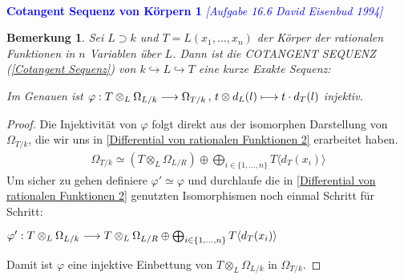 \documentclass[10pt,a4paper]{report}
\newcommand{\comment}[1]{}
\newcommand{\ModulsOfDifferenzials}{David Eisenbud 1994}
\newcounter{Aussage}[chapter]
\newtheorem{bem}[Aussage]{Bemerkung}
\newcommand{\functionfront}[3]{\nolinebreak{#1:#2 \longrightarrow #3}}
\newcommand{\function}[5]{\nolinebreak{#1:#2 \longrightarrow #3 \, , \, #4 \longmapsto #5}}
\newcommand{\divR}[2]{\Omega_{#1/#2}}
\newcommand{\divf}[1]{d_{#1}}
\newcommand{\Tensor}[3]{#1 \otimes_{#2} #3}
\newcommand{\tensor}[3]{#1 \otimes #3}
\newcommand{\Verz}[1]{\langle #1 \rangle}
\begin{document}
\ \\
\textcolor{blue}{\textbf{Cotangent Sequenz von Körpern 1} \textit{[Aufgabe 16.6 \ModulsOfDifferenzials]}}
\begin{bem} \comment{\label{Cotangent Sequenz von Körpern 1}}
Sei $L \supset k$ und $T = L(x_1, \dots ,x_n)$ der Körper der rationalen Funktionen in $n$ Variablen über $L$. Dann ist die COTANGENT SEQUENZ \textit{(\cref{Cotangent Sequenz})} von $k \hookrightarrow L \hookrightarrow T$ eine kurze Exakte Sequenz:
\begin{center}
\end{center}
Im Genauen ist $\function{\varphi}{\Tensor{T}{L}{\divR{L}{k}}}{\divR{T}{k}}{\tensor{t}{L}{\divf{L}(l)}}{t \cdot \divf{T}(l)}$ injektiv.
\end{bem}
\begin{proof}
Die Injektivität von $\varphi$ folgt direkt aus der isomorphen Darstellung von $\divR{T}{k}$, die wir uns in \cref{Differential von rationalen Funktionen 2} erarbeitet haben.
\begin{gather*}
\divR{T}{k} \simeq (\Tensor{T}{L}{\divR{L}{R}}) \oplus \bigoplus_{i \in \lbrace 1,\dots,n \rbrace} T \Verz{\divf{T}(x_i)}
\end{gather*}
Um sicher zu gehen definiere $\varphi' \simeq \varphi$ und durchlaufe die in \cref{Differential von rationalen Funktionen 2} genutzten Isomorphismen noch einmal Schritt für Schritt:
\begin{center}
$\functionfront{\varphi'}{\Tensor{T}{L}{\divR{L}{k}}}{\Tensor{T}{L}{\divR{L}{R}} \oplus \bigoplus_{i \in \lbrace 1,\dots,n \rbrace} T \Verz{\divf{T}(x_i)}}$
\end{center}
Damit ist $\varphi$ eine injektive Einbettung von $\Tensor{T}{L}{\divR{L}{k}}$ in $\divR{T}{k}$.
\end{proof}
\end{document}
